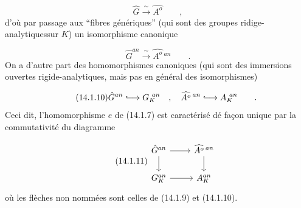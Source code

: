 \begin{equation}\tag{14.1.8}
\hat{G} \xrightarrow{\ \sim\ } \widehat{A^{o}} \qquad ,
\end{equation}
d'où par passage aux ``fibres génériques'' (qui sont des groupes ridige-analytiquessur $K$) un isomorphisme canonique

\begin{equation}\tag{14.1.9}
\hat{G}^{an} \xrightarrow{\ \sim\ } \widehat{A^{o}}\,{}^{an} \qquad .
\end{equation}
On a d'autre part des homomorphismes canoniques (qui sont des immersions ouvertes rigide-analytiques, mais pas en général des isomorphismes)

\begin{equation}\tag{14.1.10}
\hat{G}^{an} \lhook\joinrel\longrightarrow G_K^{\ an} \quad , \quad \widehat{A^{o}}\,{}^{an} \lhook\joinrel\longrightarrow A_K^{\ an} \qquad .
\end{equation}
Ceci dit, l'homomorphisme $e$ de (14.1.7) est caractérisé dé façon unique par la commutativité du diagramme

\begin{equation}\tag{14.1.11}
\begin{tikzcd}
\hat{G}^{an} \arrow[r] \arrow[d] & \widehat{A^{o}}\,{}^{an} \arrow[d] \\
G_K^{an} \arrow[r] & A_K^{an}
\end{tikzcd}
\end{equation}
où les flèches non nommées sont celles de (14.1.9) et (14.1.10).



